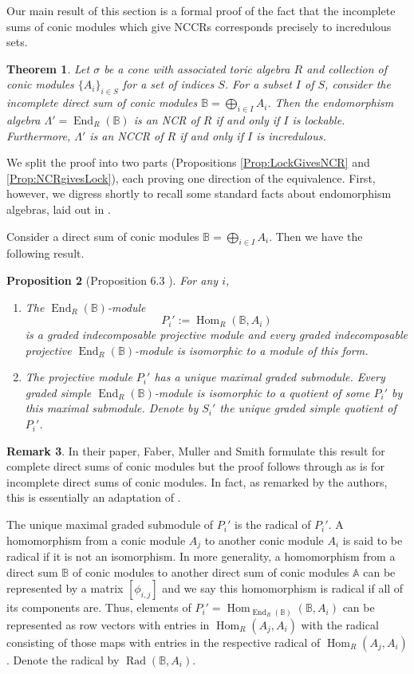 \documentclass[reqno, 12pt]{amsart}
\newtheorem{theorem}{Theorem}[section]
\newtheorem{proposition}[theorem]{Proposition}
\theoremstyle{definition}
\newtheorem{remark}[theorem]{Remark}
\numberwithin{equation}{section}
\newcommand{\newterm}{\textsf}
\newcommand{\Hom}{\operatorname{Hom}}
\newcommand{\End}{\operatorname{End}}
\begin{document}
Our main result of this section is a formal proof of the fact that the incomplete sums of conic modules which give NCCRs corresponds precisely to incredulous sets. 

\begin{theorem}
\label{Thm:NCRiffLock}
Let $\sigma$ be a cone with associated toric algebra $R$ and collection of conic modules $\{A_i\}_{i\in S}$ for a set of indices $S$. For a subset $I$ of $S$, consider the incomplete direct sum of conic modules $\mathbb{B}=\bigoplus_{i\in I}A_i$. Then the endomorphism algebra $\Lambda'=\End_R(\mathbb{B})$ is an NCR of $R$ if and only if $I$ is lockable. Furthermore, $\Lambda'$ is an NCCR of $R$ if and only if $I$ is incredulous.
\end{theorem}

We split the proof into two parts (Propositions \ref{Prop:LockGivesNCR} and \ref{Prop:NCRgivesLock}), each proving one direction of the equivalence. First, however, we digress shortly to recall some standard facts about endomorphism algebras, laid out in \cite{FMS19}.

Consider a direct sum of conic modules $\mathbb{B}=\bigoplus_{i\in I}A_i$. Then we have the following result.
\begin{proposition}[Proposition 6.3 \cite{FMS19}]
    \label{Prop:FMS 6.3}
    For any $i$,
    \begin{enumerate}
        \item The $\End_R(\mathbb{B})$-module \[
        P_i':=\Hom_R(\mathbb{B},A_i)
        \] is a graded indecomposable projective module and every graded indecomposable projective $\End_R(\mathbb{B})$-module is isomorphic to a module of this form.
        \item The projective module $P_i'$ has a unique maximal graded submodule. Every graded simple $\End_R(\mathbb{B})$-module is isomorphic to a quotient of some $P_i'$ by this maximal submodule. Denote by $S_i'$ the unique graded simple quotient of $P_i'$.
        \end{enumerate}
\end{proposition}
\begin{remark}
    In their paper, Faber, Muller and Smith formulate this result for complete direct sums of conic modules but the proof follows through as is for incomplete direct sums of conic modules. In fact, as remarked by the authors, this is essentially an adaptation of \cite[Lemma 4.1.1]{SVdB02}.
\end{remark}
The unique maximal graded submodule of $P_i'$ is the \newterm{radical} of $P_i'$. A homomorphism from a conic module $A_j$ to another conic module $A_i$ is said to be \newterm{radical} if it is not an isomorphism. In more generality, a homomorphism from a direct sum $\mathbb{B}$ of conic modules to another direct sum of conic modules $\mathbb{A}$ can be represented by a matrix $[\phi_{i,j}]$ and we say this homomorphism is radical if all of its components are. Thus, elements of $P_i'=\Hom_{\End_R(\mathbb{B})}(\mathbb{B},A_i)$ can be represented as row vectors with entries in $\Hom_R(A_j,A_i)$ with the radical consisting of those maps with entries in the respective radical of $\Hom_R(A_j,A_i)$. Denote the radical by $\operatorname{Rad}(\mathbb{B},A_i)$.
\end{document}
